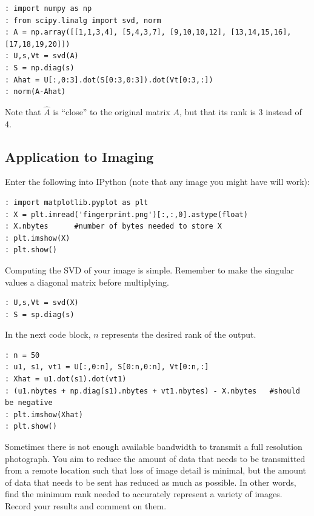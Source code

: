 \begin{lstlisting}
: import numpy as np
: from scipy.linalg import svd, norm
: A = np.array([[1,1,3,4], [5,4,3,7], [9,10,10,12], [13,14,15,16], [17,18,19,20]])
: U,s,Vt = svd(A)
: S = np.diag(s)
: Ahat = U[:,0:3].dot(S[0:3,0:3]).dot(Vt[0:3,:])
: norm(A-Ahat)
\end{lstlisting}
Note that $\widehat A$ is ``close'' to the original matrix $A$, but that its rank is 3 instead of 4.

\subsection*{Application to Imaging}
Enter the following into IPython (note that any image you might have will work):
\begin{lstlisting}
: import matplotlib.pyplot as plt
: X = plt.imread('fingerprint.png')[:,:,0].astype(float)
: X.nbytes      #number of bytes needed to store X
: plt.imshow(X)
: plt.show()
\end{lstlisting}
Computing the SVD of your image is simple.
Remember to make the singular values a diagonal matrix before multiplying.
\begin{lstlisting}
: U,s,Vt = svd(X)
: S = sp.diag(s)
\end{lstlisting}
In the next code block, $n$ represents the desired rank of the output.
\begin{lstlisting}
: n = 50
: u1, s1, vt1 = U[:,0:n], S[0:n,0:n], Vt[0:n,:]
: Xhat = u1.dot(s1).dot(vt1)
: (u1.nbytes + np.diag(s1).nbytes + vt1.nbytes) - X.nbytes   #should be negative
: plt.imshow(Xhat)
: plt.show()
\end{lstlisting}


\begin{problem}
Sometimes there is not enough available bandwidth to transmit a full resolution photograph.
You aim to reduce the amount of data that needs to be transmitted from a remote location such that loss of image detail is minimal, but the amount of data that needs to be sent has reduced as much as possible.
In other words, find the minimum rank needed to accurately represent a variety of images.
Record your results and comment on them.
\end{problem}
